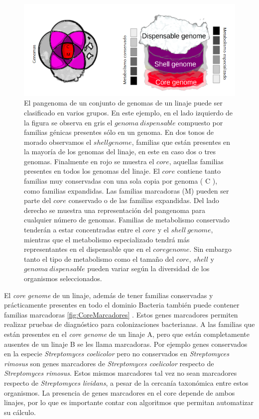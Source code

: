 \documentclass[]{article}
\begin{document}
\begin{figure}[h!tbp]
\centering
\includegraphics[angle = 0,scale = .75]{chapter1/Metabolismo-Pangenoma.png}
\caption[El metabolismo en el Pangenoma]{\footnotesize{El pangenoma de un conjunto de genomas de un linaje puede ser clasificado en varios grupos. En este ejemplo, en el lado izquierdo de la figura se observa en gris el $genoma~dispensable$ compuesto por familias génicas presentes sólo en un genoma. En dos tonos de morado observamos el $shell genome$, familias que están presentes en la mayoría de los genomas del linaje, en este en caso dos o tres genomas. Finalmente en rojo se muestra el $core$, aquellas familias presentes en todos los genomas del linaje. El $core$ contiene tanto familias muy conservadas con una sola copia por genoma ( C ), como familias expandidas. Las familias marcadoras (M) pueden ser parte del $core$ conservado o de las familias expandidas. Del lado derecho se muestra una representación del pangenoma para cualquier número de genomas. Familias de metabolismo conservado tenderán a estar concentradas entre el $core$ y el $shell~genome$, mientras que el metabolismo especializado tendrá más representantes en el dispensable que en el $core genome$. Sin embargo tanto el tipo de metabolismo como el tamaño del $core$, $shell$ y $genoma~dispensable$ pueden variar según la diversidad de los organismos seleccionados. }}
\label{fig:MetabolismoPangenoma}
\end{figure}

El \emph{core genome} de un linaje, además de tener familias conservadas
y prácticamente presentes en todo el dominio Bacteria también puede
contener familias marcadoras \autoref{fig:CoreMarcadores} . Estos genes
marcadores permiten realizar pruebas de diagnóstico para colonizaciones
bacterianas. A las familias que están presentes en el \emph{core genome}
de un linaje A, pero que están completamente ausentes de un linaje B se
les llama marcadoras. Por ejemplo genes conservados en la especie
\emph{Streptomyces coelicolor} pero no conservados en \emph{Streptomyces
rimosus} son genes marcadores de \emph{Streptomyces coelicolor} respecto
de \emph{Streptomyces rimosus}. Estos mismos marcadores tal vez no sean
marcadores respecto de \emph{Streptomyces lividans}, a pesar de la
cercanía taxonómica entre estos organismos. La presencia de genes
marcadores en el core depende de ambos linajes, por lo que es importante
contar con algoritmos que permitan automatizar su cálculo.
\end{document}
